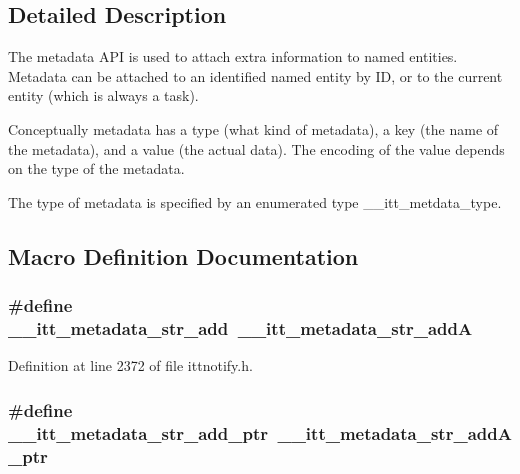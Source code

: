 \subsection{Detailed Description}
The metadata A\-P\-I is used to attach extra information to named entities. Metadata can be attached to an identified named entity by I\-D, or to the current entity (which is always a task).

Conceptually metadata has a type (what kind of metadata), a key (the name of the metadata), and a value (the actual data). The encoding of the value depends on the type of the metadata.

The type of metadata is specified by an enumerated type \-\_\-\-\_\-itt\-\_\-metdata\-\_\-type. 

\subsection{Macro Definition Documentation}
\hypertarget{group__metadata_gabd5fb0265c614e638f36fb465c372e8d}{
\subsubsection[{\-\_\-\-\_\-itt\-\_\-metadata\-\_\-str\-\_\-add}]{\setlength{\rightskip}{0pt plus 5cm}\#define \-\_\-\-\_\-itt\-\_\-metadata\-\_\-str\-\_\-add~{\bf \-\_\-\-\_\-itt\-\_\-metadata\-\_\-str\-\_\-add\-A}}}\label{group__metadata_gabd5fb0265c614e638f36fb465c372e8d}


Definition at line 2372 of file ittnotify.\-h.

\hypertarget{group__metadata_ga8ebe7302eaf9f291ede62e0f49c846ce}{
\subsubsection[{\-\_\-\-\_\-itt\-\_\-metadata\-\_\-str\-\_\-add\-\_\-ptr}]{\setlength{\rightskip}{0pt plus 5cm}\#define \-\_\-\-\_\-itt\-\_\-metadata\-\_\-str\-\_\-add\-\_\-ptr~\-\_\-\-\_\-itt\-\_\-metadata\-\_\-str\-\_\-add\-A\-\_\-ptr}}\label{group__metadata_ga8ebe7302eaf9f291ede62e0f49c846ce}


